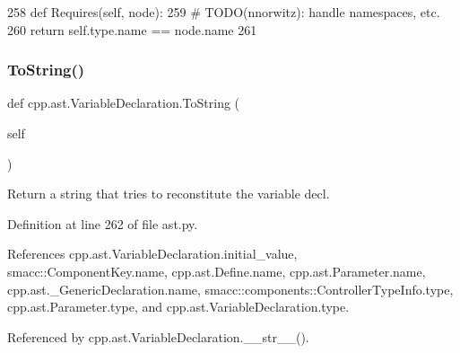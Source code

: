 \begin{DoxyCode}
258     \textcolor{keyword}{def }Requires(self, node):
259         \textcolor{comment}{# TODO(nnorwitz): handle namespaces, etc.}
260         \textcolor{keywordflow}{return} self.type.name == node.name
261 
\end{DoxyCode}
\mbox{\label{classcpp_1_1ast_1_1VariableDeclaration_a047aa4afddf7b7823a4095cea9477a21}} 
\subsubsection{\texorpdfstring{To\+String()}{ToString()}}
{\footnotesize\ttfamily def cpp.\+ast.\+Variable\+Declaration.\+To\+String (\begin{DoxyParamCaption}\item[{}]{self }\end{DoxyParamCaption})}

\begin{DoxyVerb}Return a string that tries to reconstitute the variable decl.\end{DoxyVerb}
 

Definition at line 262 of file ast.\+py.



References cpp.\+ast.\+Variable\+Declaration.\+initial\+\_\+value, smacc\+::\+Component\+Key.\+name, cpp.\+ast.\+Define.\+name, cpp.\+ast.\+Parameter.\+name, cpp.\+ast.\+\_\+\+Generic\+Declaration.\+name, smacc\+::components\+::\+Controller\+Type\+Info.\+type, cpp.\+ast.\+Parameter.\+type, and cpp.\+ast.\+Variable\+Declaration.\+type.



Referenced by cpp.\+ast.\+Variable\+Declaration.\+\_\+\+\_\+str\+\_\+\+\_\+().



